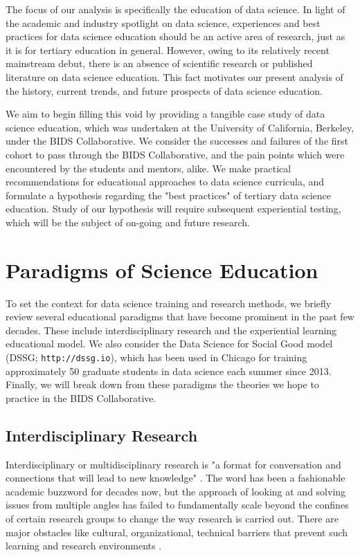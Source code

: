 \documentclass{sig-alternate}
\begin{document}
The focus of our analysis is specifically the education of data science. In light of the academic and industry spotlight on data science, experiences and best practices for data science education should be an active area of research, just as it is for tertiary education in general.  However, owing to its relatively recent mainstream debut, there is an absence of scientific research or published literature on data science education.  This fact motivates our present analysis of the history, current trends, and future prospects of data science education.

We aim to begin filling this void by providing a tangible case study of data science education, which was undertaken at the University of California, Berkeley, under the BIDS Collaborative. We consider the successes and failures of the first cohort to pass through the BIDS Collaborative, and the pain points which were encountered by the students and mentors, alike.  We make practical recommendations for educational approaches to data science curricula, and formulate a hypothesis regarding the "best practices" of tertiary data science education.  Study of our hypothesis will require subsequent experiential testing, which will be the subject of on-going and future research.



\section{Paradigms of Science Education}

To set the context for data science training and research methods, we briefly review several educational paradigms that have become prominent in the past few decades. These include interdisciplinary research and the experiential learning educational model. We also consider the Data Science for Social Good model (DSSG; \texttt{http://dssg.io}), which has been used in Chicago for training approximately 50 graduate students in data science each summer since 2013. Finally, we will break down from these paradigms the theories we hope to practice in the BIDS Collaborative.

\subsection{Interdisciplinary Research}

Interdisciplinary or multidisciplinary research is "a format for conversation and connections that will lead to new knowledge" \cite{repko2008interdisciplinary}. The word has been a fashionable academic buzzword for decades now, but the approach of looking at and solving issues from multiple angles has failed to fundamentally scale beyond the confines of certain research groups to change the way research is carried out. There are major obstacles like cultural, organizational, technical barriers that prevent such learning and research environments \cite{eisenberg2000bridging}.
\end{document}
